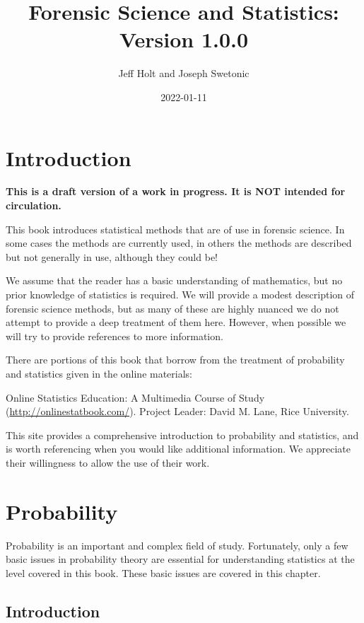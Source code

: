 \documentclass[
]{book}
\title{Forensic Science and Statistics: Version 1.0.0}
\author{Jeff Holt and Joseph Swetonic}
\date{2022-01-11}
\begin{document}
\maketitle

{
\setcounter{tocdepth}{1}
\tableofcontents
}
\hypertarget{introduction}{%
\chapter{Introduction}\label{introduction}}

\textbf{This is a draft version of a work in progress. It is NOT intended for circulation.}

This book introduces statistical methods that are of use in forensic science. In some cases the methods are currently used,
in others the methods are described but not generally in use, although they could be!

We assume that the reader has a basic understanding of mathematics, but no prior knowledge of statistics is required.
We will provide a modest description of forensic science methods, but as many of these are highly nuanced we do not attempt to
provide a deep treatment of them here. However, when possible we will try to provide references to more information.

There are portions of this book that borrow from the treatment of probability and statistics given in the online materials:

Online Statistics Education: A Multimedia Course of Study (\url{http://onlinestatbook.com/}). Project Leader: David M. Lane, Rice University.

This site provides a comprehensive introduction to probability and statistics, and is worth referencing when you would like additional information.
We appreciate their willingness to allow the use of their work.

\hypertarget{probability}{%
\chapter{Probability}\label{probability}}

Probability is an important and complex field of study.
Fortunately, only a few basic issues in probability theory are essential for understanding statistics at the level covered in this book.
These basic issues are covered in this chapter.

\hypertarget{introduction-1}{%
\section{Introduction}\label{introduction-1}}
\end{document}

